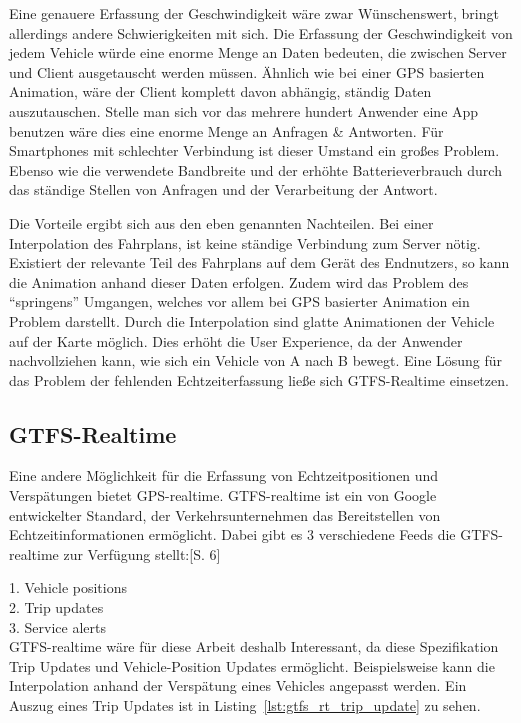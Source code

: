 \begin{newpage}
        Eine genauere Erfassung der Geschwindigkeit wäre zwar Wünschenswert, bringt allerdings andere Schwierigkeiten mit sich. Die Erfassung der Geschwindigkeit von jedem Vehicle würde eine enorme Menge an Daten bedeuten, die zwischen Server und Client ausgetauscht werden müssen. Ähnlich wie bei einer GPS basierten Animation, wäre der Client komplett davon abhängig, ständig Daten auszutauschen. Stelle man sich vor das mehrere hundert Anwender eine App benutzen wäre dies eine enorme Menge an Anfragen \& Antworten. Für Smartphones mit schlechter Verbindung ist dieser Umstand ein großes Problem. Ebenso wie die verwendete Bandbreite und der erhöhte Batterieverbrauch durch das ständige Stellen von Anfragen und der Verarbeitung der Antwort.

        Die Vorteile ergibt sich aus den eben genannten Nachteilen. Bei einer Interpolation des Fahrplans, ist keine ständige Verbindung zum Server nötig. Existiert der relevante Teil des Fahrplans auf dem Gerät des Endnutzers, so kann die Animation anhand dieser Daten erfolgen. Zudem wird das Problem des "`springens"' Umgangen, welches vor allem bei GPS basierter Animation ein Problem darstellt. Durch die Interpolation sind glatte Animationen der Vehicle auf der Karte möglich. Dies erhöht die User Experience, da der Anwender nachvollziehen kann, wie sich ein Vehicle von A nach B bewegt.
        Eine Lösung für das Problem der fehlenden Echtzeiterfassung ließe sich GTFS-Realtime einsetzen.
      
      
      \subsection{GTFS-Realtime}
      \label{sub:gtfs_realtime}
        Eine andere Möglichkeit für die Erfassung von Echtzeitpositionen und Verspätungen bietet GPS-realtime. GTFS-realtime ist ein von Google entwickelter Standard, der Verkehrsunternehmen das Bereitstellen von Echtzeitinformationen ermöglicht. Dabei gibt es 3 verschiedene Feeds die GTFS-realtime zur Verfügung stellt:\parencite{zervaas_realtime}[S. 6]

        1. Vehicle positions\\
        2. Trip updates\\
        3. Service alerts\\

        GTFS-realtime wäre für diese Arbeit deshalb Interessant, da diese Spezifikation Trip Updates und Vehicle-Position Updates ermöglicht. Beispielsweise kann die Interpolation anhand der Verspätung eines Vehicles angepasst werden. Ein Auszug eines Trip Updates ist in Listing~\ref{lst:gtfs_rt_trip_update} zu sehen.


\end{newpage}
